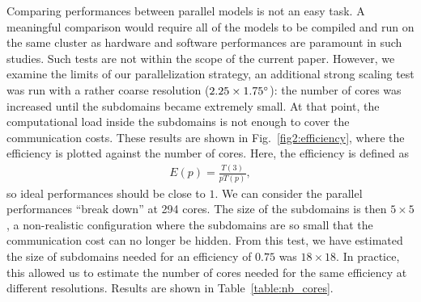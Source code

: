    Comparing performances between parallel models is not an easy task. A
   meaningful comparison would require all of the models to be compiled and run on the
   same cluster as hardware and software performances are paramount in such
   studies. Such tests are not within the scope of the current paper. However, we
   examine the limits of our parallelization strategy, an additional strong scaling
   test was run with a rather coarse resolution ($2.25\times1.75^{\circ}$): the
   number of cores was increased until the subdomains became extremely small. At that
   point, the computational load inside the subdomains is not enough to cover
   the communication costs. These results are shown in
   Fig.~\ref{fig2:efficiency},
   where the efficiency is plotted against the number of cores. Here, the
   efficiency is defined as
   \begin{align*}
     E(p) = \frac{T(3)}{p T(p)},
   \end{align*}
   so ideal performances should be close to $1$. We can consider the parallel
   performances ``break down'' at 294 cores. The size of the subdomains is then
   $5\times5$, a non-realistic configuration where the subdomains are so small
   that the communication cost can no longer be hidden. From this test, we have
   estimated the size of subdomains needed for an efficiency of $0.75$ was
   $18\times18$.  In practice, this allowed us to estimate the number of cores
   needed for the same efficiency at different resolutions. Results are shown in
   Table~\ref{table:nb_cores}.


